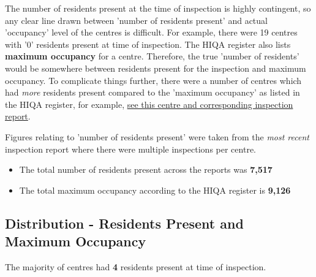 \documentclass[a4paper,11pt,twoside]{article}
\begin{document}
The number of residents present at the time of inspection is highly contingent, so any clear line drawn between 'number of residents present' and actual 'occupancy' level of the centres is difficult. For example, there were 19 centres with '0' residents present at time of inspection. The HIQA register also lists \textbf{maximum occupancy} for a centre. Therefore, the true 'number of residents' would be somewhere between residents present for the inspection and maximum occupancy. To complicate things further, there were a number of centres which had \emph{more} residents present compared to the 'maximum occupancy' as listed in the HIQA register, for example, \href{https://www.hiqa.ie/areas-we-work/find-a-centre/grove-1}{see this centre and corresponding inspection report}.

Figures relating to 'number of residents present' were taken from the \emph{most recent} inspection report where there were multiple inspections per centre.
\begin{itemize}
\item The total number of residents present across the reports was \textbf{7,517}
\item The total maximum occupancy according to the HIQA register is \textbf{9,126}
\end{itemize}
\subsection{Distribution - Residents Present and Maximum Occupancy}
\label{sec:orgedf1433}
The majority of centres had \textbf{4} residents present at time of inspection.
\end{document}
